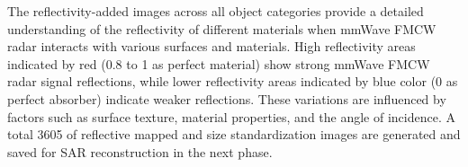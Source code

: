 \documentclass[journal,article,submit,pdftex,moreauthors]{Definitions/mdpi}
\begin{document}

The reflectivity-added images across all object categories provide a detailed understanding of the reflectivity of different materials when mmWave FMCW radar interacts with various surfaces and materials. High reflectivity areas indicated by red (0.8 to 1 as perfect material) show strong mmWave FMCW radar signal reflections, while lower reflectivity areas indicated by blue color (0 as perfect absorber) indicate weaker reflections. These variations are influenced by factors such as surface texture, material properties, and the angle of incidence. A total 3605 of reflective mapped and size standardization images are generated and saved for SAR reconstruction in the next phase. 



\end{document}
